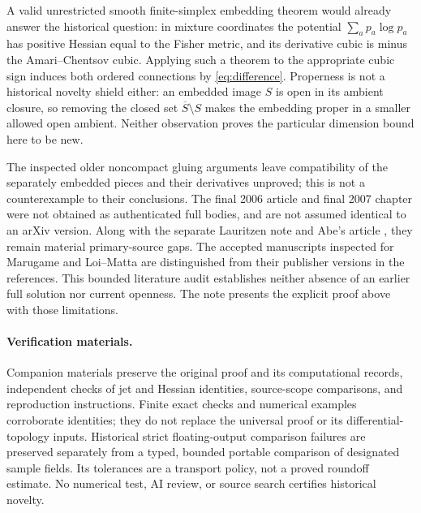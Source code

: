 \documentclass[10pt,letterpaper]{article}
\begin{document}
A valid unrestricted smooth finite-simplex embedding theorem would already
answer the historical question: in mixture coordinates the potential
$\sum_a p_a\log p_a$ has positive Hessian equal to the Fisher metric, and
its derivative cubic is minus the Amari--Chentsov cubic. Applying such a
theorem to the appropriate cubic sign induces both ordered connections
by \eqref{eq:difference}. Properness is not a historical novelty shield
either: an embedded image $S$ is open in its ambient closure, so removing
the closed set $\overline S\setminus S$ makes the embedding proper in a
smaller allowed open ambient. Neither observation proves the particular
dimension bound here to be new.

The inspected older noncompact gluing arguments leave compatibility of the
separately embedded pieces and their derivatives unproved; this is not a
counterexample to their conclusions. The final 2006 article and final 2007
chapter were not obtained as authenticated full bodies, and are not assumed
identical to an arXiv version. Along with the separate Lauritzen note and
Abe's article \cite{Abe}, they remain material primary-source gaps. The
accepted manuscripts inspected for Marugame and Loi--Matta are distinguished
from their publisher versions in the references. This bounded literature
audit establishes neither absence of an earlier full solution nor current
openness. The note presents the explicit proof above with those limitations.

\paragraph{Verification materials.}
Companion materials preserve the original proof and its computational
records, independent checks of jet and Hessian identities, source-scope
comparisons, and reproduction instructions. Finite exact checks and
numerical examples corroborate identities; they do not replace the universal
proof or its differential-topology inputs. Historical strict floating-output
comparison failures are preserved separately from a typed, bounded portable
comparison of designated sample fields. Its tolerances are a transport
policy, not a proved roundoff estimate. No numerical test, AI review, or
source search certifies historical novelty.
\end{document}
